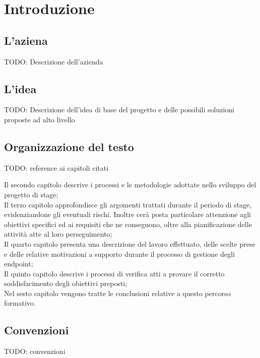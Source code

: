 \chapter{Introduzione\label{cap:introduzione}}

\section{L'aziena}
TODO: Descrizione dell'azienda

\section{L'idea}
TODO: Descrizione dell'idea di base del progetto e delle possibili soluzioni proposte ad alto livello

\section{Organizzazione del testo}
TODO: reference ai capitoli citati

Il secondo capitolo descrive i processi e le metodologie adottate nello sviluppo del progetto di stage;\\

Il terzo capitolo approfondisce gli argomenti trattati durante il periodo di stage, evidenziandone gli eventuali rischi. Inoltre cerà posta particolare attenzione agli obiettivi specifici ed ai requisiti che ne conseguono, oltre alla pianificazione delle attività atte al loro perseguimento;\\

Il quarto capitolo presenta una descrizione del lavoro effettuato, delle scelte prese e delle relative motivazioni a supporto durante il processo di gestione degli endpoint;\\

Il quinto capitolo descrive i processi di verifica atti a provare il corretto soddisfacimento degli obiettivi preposti;\\

Nel sesto capitolo vengono tratte le conclusioni relative a questo percorso formativo.

\section{Convenzioni}
TODO: convenzioni